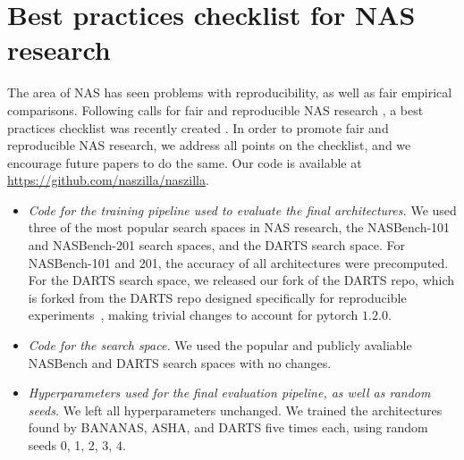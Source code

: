 \documentclass[11pt]{article}
\numberwithin{equation}{section}
\numberwithin{figure}{section}
\theoremstyle{plain}
\theoremstyle{definition}
\begin{document}
 \section{Best practices checklist for NAS research} \label{app:checklist}
The area of NAS has seen problems with reproducibility, 
as well as fair empirical comparisons.
Following calls for fair and reproducible NAS research \cite{randomnas, nasbench}, a best practices checklist was recently created \cite{lindauer2019best}.
In order to promote fair and reproducible NAS research, we address all points on the checklist, and we encourage future papers to do the same.
Our code is available at \url{https://github.com/naszilla/naszilla}.

\begin{itemize}
    \item \emph{Code for the training pipeline used to evaluate the final architectures.}
    We used three of the most popular search spaces in NAS research, the NASBench-101 and NASBench-201 search spaces, and the DARTS search space.
    For NASBench-101 and 201, the accuracy of all architectures were precomputed.
    For the DARTS search space, we released our fork of the DARTS repo, which is forked from the DARTS repo designed specifically for reproducible experiments~\cite{randomnas}, making trivial changes to account for pytorch $1.2.0$.
    \item \emph{Code for the search space.}
    We used the popular and publicly avaliable NASBench and DARTS search spaces with no changes.
    \item \emph{Hyperparameters used for the final evaluation pipeline, as well as random seeds.}
    We left all hyperparameters unchanged.
    We trained the architectures found by BANANAS, ASHA, and DARTS five times each,
    using random seeds 0, 1, 2, 3, 4.


\end{itemize}
\end{document}
